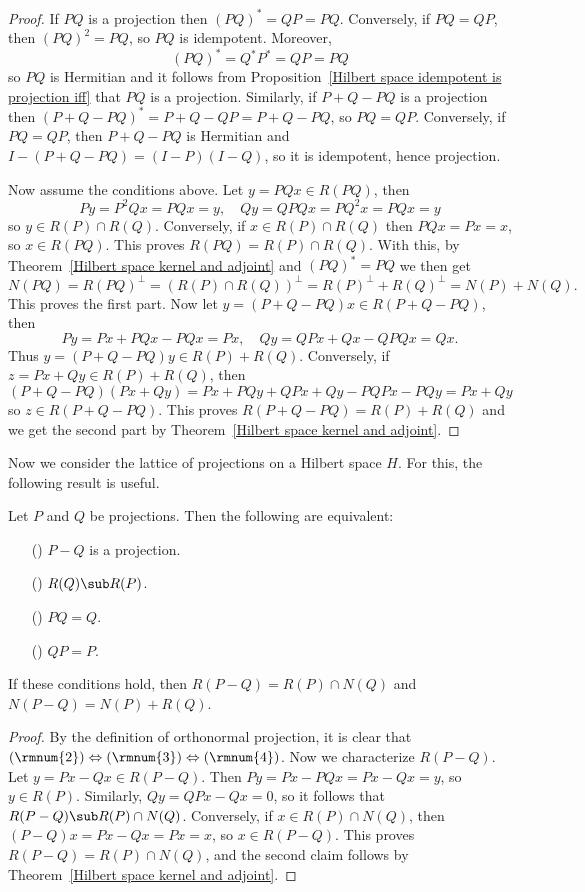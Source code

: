 \begin{proof}
If $PQ$ is a projection then $(PQ)^*=QP=PQ$. Conversely, if $PQ=QP$, then $(PQ)^2=PQ$, so $PQ$ is idempotent. Moreover, 
\[(PQ)^*=Q^*P^*=QP=PQ\]
so $PQ$ is Hermitian and it follows from Proposition~\ref{Hilbert space idempotent is projection iff} that $PQ$ is a projection. Similarly, if $P+Q-PQ$ is a projection then $(P+Q-PQ)^*=P+Q-QP=P+Q-PQ$, so $PQ=QP$. Conversely, if $PQ=QP$, then $P+Q-PQ$ is Hermitian and $I-(P+Q-PQ)=(I-P)(I-Q)$, so it is idempotent, hence projection.\par
Now assume the conditions above. Let $y=PQx\in R(PQ)$, then
\[Py=P^2Qx=PQx=y,\quad Qy=QPQx=PQ^2x=PQx=y\]
so $y\in R(P)\cap R(Q)$. Conversely, if $x\in R(P)\cap R(Q)$ then $PQx=Px=x$, so $x\in R(PQ)$. This proves $R(PQ)=R(P)\cap R(Q)$. With this, by Theorem~\ref{Hilbert space kernel and adjoint} and $(PQ)^*=PQ$ we then get
\[N(PQ)=R(PQ)^\bot=(R(P)\cap R(Q))^\bot=R(P)^\bot+R(Q)^\bot=N(P)+N(Q).\]
This proves the first part. Now let $y=(P+Q-PQ)x\in R(P+Q-PQ)$, then
\[Py=Px+PQx-PQx=Px,\quad Qy=QPx+Qx-QPQx=Qx.\]
Thus $y=(P+Q-PQ)y\in R(P)+R(Q)$. Conversely, if $z=Px+Qy\in R(P)+R(Q)$, then
\[(P+Q-PQ)(Px+Qy)=Px+PQy+QPx+Qy-PQPx-PQy=Px+Qy\]
so $z\in R(P+Q-PQ)$. This proves $R(P+Q-PQ)=R(P)+R(Q)$ and we get the second part by Theorem~\ref{Hilbert space kernel and adjoint}.
\end{proof}
Now we consider the lattice of projections on a Hilbert space $H$. For this, the following result is useful.
\begin{proposition}\label{Hilbert space difference of projection}
Let $P$ and $Q$ be projections. Then the following are equivalent:
\begin{itemize}
\item[(\rmnum{1})] $P-Q$ is a projection.
\item[(\rmnum{2})] $R(Q)\sub R(P)$.
\item[(\rmnum{3})] $PQ=Q$.
\item[(\rmnum{4})] $QP=P$. 
\end{itemize}
If these conditions hold, then $R(P-Q)=R(P)\cap N(Q)$ and $N(P-Q)=N(P)+R(Q)$.
\end{proposition}
\begin{proof}
By the definition of orthonormal projection, it is clear that $(\rmnum{2})\Leftrightarrow(\rmnum{3})\Leftrightarrow(\rmnum{4})$. Now we characterize $R(P-Q)$. Let $y=Px-Qx\in R(P-Q)$. Then $Py=Px-PQx=Px-Qx=y$, so $y\in R(P)$. Similarly, $Qy=QPx-Qx=0$, so it follows that $R(P-Q)\sub R(P)\cap N(Q)$. Conversely, if $x\in R(P)\cap N(Q)$, then $(P-Q)x=Px-Qx=Px=x$, so $x\in R(P-Q)$. This proves $R(P-Q)=R(P)\cap N(Q)$, and the second claim follows by Theorem~\ref{Hilbert space kernel and adjoint}.
\end{proof}
